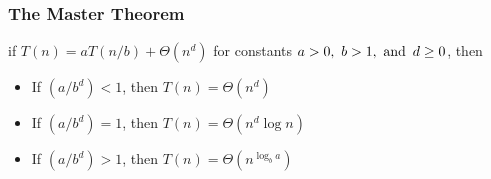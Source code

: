 \subsubsection*{The Master Theorem}
if $T(n) = aT(n/b) + \Theta(n^d)$ for constants $a>0,~b>1,\operatorname{~\text{and}~} d \geq 0$, then
\begin{itemize}
  \item If $(a/b^d) < 1$, then $T(n) = \Theta(n^d)$
  \item If $(a/b^d) = 1$, then $T(n) = \Theta(n^d \log n)$
  \item If $(a/b^d) > 1$, then $T(n) = \Theta(n^{\log_b a})$
\end{itemize}